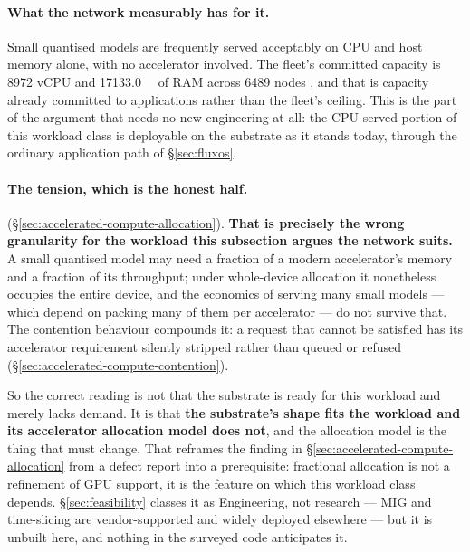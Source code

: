 \paragraph{What the network measurably has for it.}
Small quantised models are frequently served acceptably on CPU and host memory alone, with no
accelerator involved. The fleet's committed capacity is \num{8972} vCPU and \qty{17133.0}{\gibi\byte}
of RAM across \num{6489} nodes , and that is capacity already committed to applications rather than
the fleet's ceiling. This is the part of the argument that needs no new engineering at all: the
CPU-served portion of this workload class is deployable on the substrate as it stands today, through the
ordinary application path of \S\ref{sec:fluxos}.

\paragraph{The tension, which is the honest half.}
 (\S\ref{sec:accelerated-compute-allocation}). \textbf{That is precisely the
wrong granularity for the workload this subsection argues the network suits.} A small quantised model
may need a fraction of a modern accelerator's memory and a fraction of its throughput; under
whole-device allocation it nonetheless occupies the entire device, and the economics of serving many
small models --- which depend on packing many of them per accelerator --- do not survive that. The
contention behaviour compounds it: a request that cannot be satisfied has its accelerator requirement
silently stripped rather than queued or refused (\S\ref{sec:accelerated-compute-contention}).

So the correct reading is not that the substrate is ready for this workload and merely lacks demand. It
is that \textbf{the substrate's shape fits the workload and its accelerator allocation model does
not}, and the allocation model is the thing that must change. That reframes the finding in
\S\ref{sec:accelerated-compute-allocation} from a defect report into a prerequisite: fractional allocation is not a
refinement of GPU support, it is the feature on which this workload class depends. \S\ref{sec:feasibility}
classes it as Engineering, not research --- MIG and time-slicing are vendor-supported and widely
deployed elsewhere --- but it is unbuilt here, and nothing in the surveyed code anticipates it.

